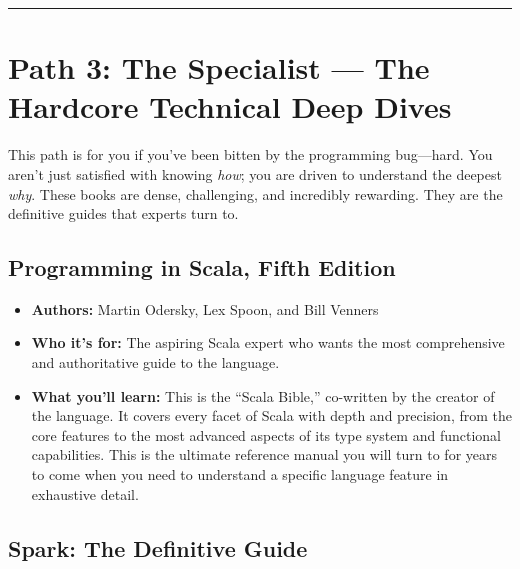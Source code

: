 \documentclass[
  letterpaper,
  DIV=11,
  numbers=noendperiod]{scrreprt}
\providecommand{\tightlist}{%
  \setlength{\itemsep}{0pt}\setlength{\parskip}{0pt}}
\begin{document}
\begin{center}\rule{0.5\linewidth}{0.5pt}\end{center}

\section{\texorpdfstring{\textbf{Path 3: The Specialist --- The Hardcore
Technical Deep
Dives}}{Path 3: The Specialist --- The Hardcore Technical Deep Dives}}\label{path-3-the-specialist-the-hardcore-technical-deep-dives}

This path is for you if you've been bitten by the programming
bug---hard. You aren't just satisfied with knowing \emph{how}; you are
driven to understand the deepest \emph{why}. These books are dense,
challenging, and incredibly rewarding. They are the definitive guides
that experts turn to.

\subsection{\texorpdfstring{\textbf{Programming in Scala, Fifth
Edition}}{Programming in Scala, Fifth Edition}}\label{programming-in-scala-fifth-edition}

\begin{itemize}
\tightlist
\item
  \textbf{Authors:} Martin Odersky, Lex Spoon, and Bill Venners
\item
  \textbf{Who it's for:} The aspiring Scala expert who wants the most
  comprehensive and authoritative guide to the language.
\item
  \textbf{What you'll learn:} This is the ``Scala Bible,'' co-written by
  the creator of the language. It covers every facet of Scala with depth
  and precision, from the core features to the most advanced aspects of
  its type system and functional capabilities. This is the ultimate
  reference manual you will turn to for years to come when you need to
  understand a specific language feature in exhaustive detail.
\end{itemize}

\subsection{\texorpdfstring{\textbf{Spark: The Definitive
Guide}}{Spark: The Definitive Guide}}\label{spark-the-definitive-guide}
\end{document}
